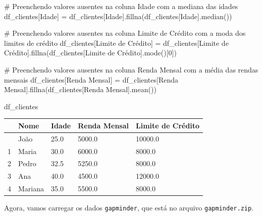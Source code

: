 \documentclass[
  portuguese,
  letterpaper,
  DIV=11,
  numbers=noendperiod]{scrreprt}
\newenvironment{Shaded}{\begin{snugshade}}{\end{snugshade}}
\newcommand{\CommentTok}[1]{\textcolor[rgb]{0.37,0.37,0.37}{#1}}
\newcommand{\DecValTok}[1]{\textcolor[rgb]{0.68,0.00,0.00}{#1}}
\newcommand{\NormalTok}[1]{\textcolor[rgb]{0.00,0.23,0.31}{#1}}
\newcommand{\OperatorTok}[1]{\textcolor[rgb]{0.37,0.37,0.37}{#1}}
\newcommand{\StringTok}[1]{\textcolor[rgb]{0.13,0.47,0.30}{#1}}
\theoremstyle{definition}
\theoremstyle{remark}
\begin{document}
\begin{Shaded}
\begin{Highlighting}[]
\CommentTok{\# Preenchendo valores ausentes na coluna \textquotesingle{}Idade\textquotesingle{} com a mediana das idades}
\NormalTok{df\_clientes[}\StringTok{\textquotesingle{}Idade\textquotesingle{}}\NormalTok{] }\OperatorTok{=}\NormalTok{ df\_clientes[}\StringTok{\textquotesingle{}Idade\textquotesingle{}}\NormalTok{].fillna(df\_clientes[}\StringTok{\textquotesingle{}Idade\textquotesingle{}}\NormalTok{].median())}

\CommentTok{\# Preenchendo valores ausentes na coluna \textquotesingle{}Limite de Crédito\textquotesingle{} com a moda dos limites de crédito}
\NormalTok{df\_clientes[}\StringTok{\textquotesingle{}Limite de Crédito\textquotesingle{}}\NormalTok{] }\OperatorTok{=}\NormalTok{ df\_clientes[}\StringTok{\textquotesingle{}Limite de Crédito\textquotesingle{}}\NormalTok{].fillna(df\_clientes[}\StringTok{\textquotesingle{}Limite de Crédito\textquotesingle{}}\NormalTok{].mode()[}\DecValTok{0}\NormalTok{])}

\CommentTok{\# Preenchendo valores ausentes na coluna \textquotesingle{}Renda Mensal\textquotesingle{} com a média das rendas mensais}
\NormalTok{df\_clientes[}\StringTok{\textquotesingle{}Renda Mensal\textquotesingle{}}\NormalTok{] }\OperatorTok{=}\NormalTok{ df\_clientes[}\StringTok{\textquotesingle{}Renda Mensal\textquotesingle{}}\NormalTok{].fillna(df\_clientes[}\StringTok{\textquotesingle{}Renda Mensal\textquotesingle{}}\NormalTok{].mean())}

\NormalTok{df\_clientes}
\end{Highlighting}
\end{Shaded}

\begin{longtable}[]{@{}lllll@{}}
\toprule\noalign{}
& Nome & Idade & Renda Mensal & Limite de Crédito \\
\midrule\noalign{}
\endhead
\bottomrule\noalign{}
\endlastfoot
0 & João & 25.0 & 5000.0 & 10000.0 \\
1 & Maria & 30.0 & 6000.0 & 8000.0 \\
2 & Pedro & 32.5 & 5250.0 & 8000.0 \\
3 & Ana & 40.0 & 4500.0 & 12000.0 \\
4 & Mariana & 35.0 & 5500.0 & 8000.0 \\
\end{longtable}

Agora, vamos carregar os dados \texttt{gapminder}, que está no arquivo
\texttt{gapminder.zip}.
\end{document}
